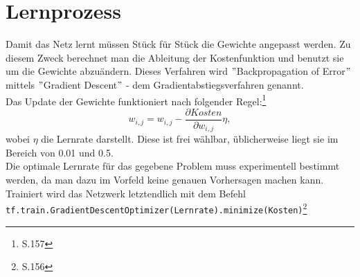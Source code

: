 \section{Lernprozess}
Damit das Netz lernt m\"ussen St\"uck f\"ur St\"uck die Gewichte angepasst werden. Zu diesem Zweck berechnet man die Ableitung der Kostenfunktion und benutzt sie um die Gewichte abzu\"andern. Dieses Verfahren wird $"$Backpropagation of Error$"$ mittels $"$Gradient Descent$"$ - dem Gradientabstiegsverfahren genannt.\\
Das Update der Gewichte funktioniert nach folgender Regel:\footnote{\cite{Rojas1996}S.157}
\begin{equation}
w_{i,j}=w_{i,j}-\frac{\partial Kosten }{\partial w_{i,j}}\eta,
\end{equation}
wobei $\eta$ die Lernrate darstellt. Diese ist frei w\"ahlbar, \"ublicherweise liegt sie im Bereich von 0.01 und 0.5.\\
Die optimale Lernrate f\"ur das gegebene Problem muss experimentell bestimmt werden, da man dazu im Vorfeld keine genauen Vorhersagen machen kann.
Trainiert wird das Netzwerk letztendlich mit dem Befehl \lstinline$tf.train.GradientDescentOptimizer(Lernrate).minimize(Kosten)$\footnote{\cite{building}S.156}